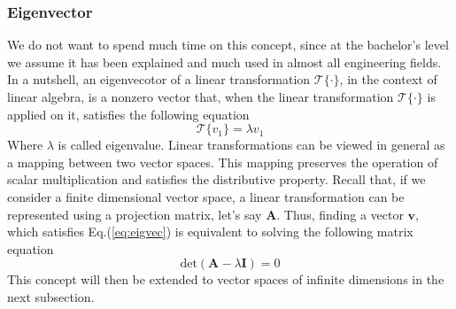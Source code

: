 \subsubsection{Eigenvector \label{kugel:ssection:eigenvector}}
We do not want to spend much time on this concept, since at the bachelor's level we assume it has been explained and much used in almost all engineering fields. 
In a nutshell, an eigenvecotor of a linear transformation $\mathcal{T}\{\cdot\}$, in the context of linear algebra, is a nonzero vector that, when the linear transformation $\mathcal{T}\{\cdot\}$ is applied on it, satisfies the following equation
\begin{equation}
\mathcal{T}\{v_1\} = \lambda v_1
\label{eq:eigvec}
\end{equation}
Where $\lambda$ is called eigenvalue.\newline
Linear transformations can be viewed in general as a mapping between two vector spaces. This mapping preserves the operation of scalar multiplication and satisfies the distributive property.\newline
Recall that, if we consider a finite dimensional vector space, a linear transformation can be represented using a projection matrix, let's say $\mathbf{A}$. 
Thus, finding a vector $\mathbf{v}$, which satisfies Eq.(\ref{eq:eigvec}) is equivalent to solving the following matrix equation
\begin{equation*}
\text{det}(\mathbf{A} - \lambda \mathbf{I} ) = 0
\end{equation*}
This concept will then be extended to vector spaces of infinite dimensions in the next subsection. 

